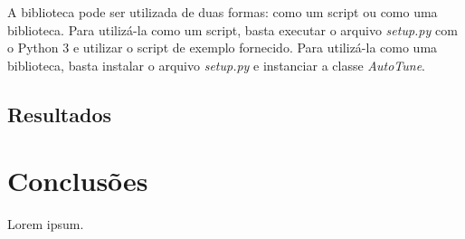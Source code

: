 \documentclass{sbrt}
\begin{document}
A biblioteca pode ser utilizada de duas formas: como um script ou como uma biblioteca. Para utilizá-la como um script,
basta executar o arquivo \textit{setup.py} com o Python 3 e utilizar o script de exemplo fornecido. Para utilizá-la como
uma biblioteca, basta instalar o arquivo \textit{setup.py} e instanciar a classe \textit{AutoTune}.

\subsection{Resultados}




\section{Conclusões}

Lorem ipsum.





\end{document}
